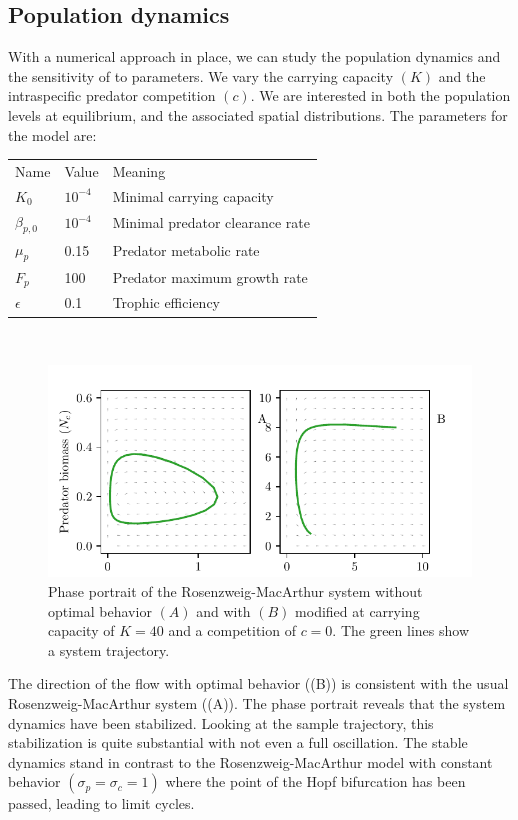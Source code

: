 \subsection{Population dynamics}
With a numerical approach in place, we can study the population dynamics and the sensitivity of  to parameters. We vary the carrying capacity $(K)$ and the intraspecific predator competition $(c)$. We are interested in both  the population levels at equilibrium, and the associated spatial distributions.
The parameters for the model are: \\
\begin{tabular}{l l l}
  Name & Value & Meaning \\
  $K_0$ & $10^{-4}$ & Minimal carrying capacity \\
  $\beta_{p,0}$ & $10^{-4}$ & Minimal predator clearance rate \\
  $\mu_p$ & 0.15 & Predator metabolic rate \\
  $F_p$ & 100 & Predator maximum growth rate \\
  $\epsilon$ & 0.1 & Trophic efficiency
\end{tabular}
\\
\begin{figure}[H]
  \label{fig:pp}
  \caption{Phase portrait of the Rosenzweig-MacArthur system without optimal behavior $(A)$ and with $(B)$ modified at carrying capacity of $K=40$ and a competition of $c=0$. The green lines show a system trajectory.}
  \label{fig:dynamics}
  \includegraphics{plots/dynamics.pdf}
\end{figure}
The direction of the flow with optimal behavior ((B)) is consistent with the usual Rosenzweig-MacArthur system ((A)). The phase portrait reveals that the system dynamics have been stabilized. Looking at the sample trajectory, this stabilization is quite substantial with not even a full oscillation. The stable dynamics stand in contrast to the Rosenzweig-MacArthur model with constant behavior $(\sigma_p=\sigma_c=1)$ where the point of the Hopf bifurcation has been passed, leading to limit cycles.


